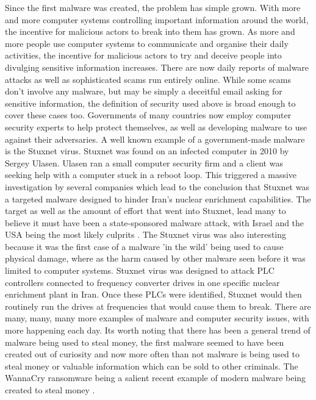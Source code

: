 Since the first malware was created, the problem has simple grown. With more and more computer systems controlling important information around the world, the incentive for malicious actors to break into them has grown. As more and more people use computer systems to communicate and organise their daily activities, the incentive for malicious actors to try and deceive people into divulging sensitive information increases. There are now daily reports of malware attacks as well as sophisticated scams run entirely online. While some scams don't involve any malware, but may be simply a deceitful email asking for sensitive information, the definition of security used above is broad enough to cover these cases too. Governments of many countries now employ computer security experts to help protect themselves, as well as developing malware to use against their adversaries. A well known example of a  government-made malware is the Stuxnet virus. Stuxnet was found on an infected computer in 2010 by Sergey Ulasen. Ulasen ran a small computer security firm and a client was seeking help with a computer stuck in a reboot loop. This triggered a massive investigation by several companies which lead to the conclusion that Stuxnet was a targeted malware designed to hinder Iran's nuclear enrichment capabilities. The target as well as the amount of effort that went into Stuxnet, lead many to believe it must have been a state-sponsored malware attack, with Israel and the USA being the most likely culprits 
\cite{RN91}\cite{RN92}. The Stuxnet virus was also interesting because it was the first case of a malware 'in the wild' being used to cause physical damage, where as the harm caused by other malware seen before it was limited to computer systems. Stuxnet virus was designed to attack PLC controllers connected to frequency converter drives in one specific nuclear enrichment plant in Iran. Once these PLCs were identified, Stuxnet would then routinely run the drives at frequencies that would cause them to break. There are many, many, many more examples of malware and computer security issues, with more happening each day. Its worth noting that there has been a general trend of malware being used to steal money, the first malware seemed to have been created out of curiosity and now more often than not malware is being used to steal money or valuable information which can be sold to other criminals. The WannaCry ransomware being a salient recent example of modern malware being created to steal money 
\cite{RN94}. 

